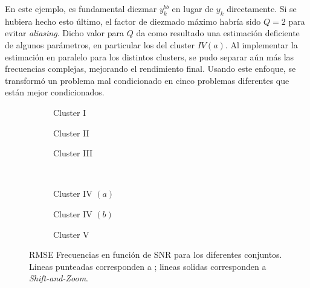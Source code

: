 			En este ejemplo, es fundamental diezmar $y^{bb}_k$ en lugar de $y_k$ directamente. Si se hubiera hecho esto último, el factor de diezmado máximo habría sido $Q =2$ para evitar \emph{aliasing}. Dicho valor para $Q$ da como resultado una estimación deficiente de algunos parámetros, en particular los del cluster $IV(a)$. Al implementar la estimación en paralelo para los distintos clusters, se pudo separar aún más las frecuencias complejas, mejorando el rendimiento final. Usando este enfoque, se transformó un problema mal condicionado en cinco problemas diferentes que están mejor condicionados.		
			\begin{figure}[h!]
				\begin{subfigure}[h]{0.5\textwidth}
					\centering
					\resizebox{\linewidth}{!}{}
					\caption{Cluster I}
					\label{SubFig:Cluster_I_imag}
				\end{subfigure}
				\begin{subfigure}[h]{0.5\textwidth}
					\centering
					\resizebox{\linewidth}{!}{}
					\caption{Cluster II}
					\label{SubFig:Cluster_II_imag}
				\end{subfigure}
				\begin{subfigure}[h]{0.5\textwidth}
					\centering
					\resizebox{\linewidth}{!}{}
					\caption{Cluster III}
					\label{SubFig:Cluster_III_imag}
				\end{subfigure}
				~
				\begin{subfigure}[h]{0.5\textwidth}
					\centering
					\resizebox{\linewidth}{!}{}
					\caption{Cluster IV $(a)$}
					\label{SubFig:Cluster_IV_imag}
				\end{subfigure}
				\begin{subfigure}[h]{0.5\textwidth}
					\centering
					\resizebox{\linewidth}{!}{}
					\caption{Cluster IV $(b)$}
					\label{SubFig:Cluster_V_imag}
				\end{subfigure}
				\begin{subfigure}[h]{0.5\textwidth}
					\centering
					\resizebox{\linewidth}{!}{}
					\caption{Cluster V}
					\label{SubFig:Cluster_VI_imag}
				\end{subfigure}
				\caption{RMSE Frecuencias en función de SNR para los diferentes conjuntos. Lineas punteadas corresponden a \cite{Andersson2014}; lineas solidas corresponden a \emph{Shift-and-Zoom}.}
				\label{Fig:RMSE_Cluster_nu}
			\end{figure}
